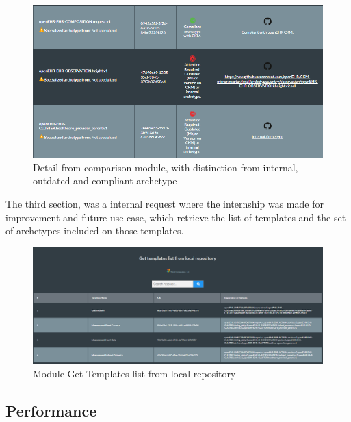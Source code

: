 \documentclass[mim_thesis.tex]{subfiles}
\begin{document}
\begin{figure}[H]
	\centering
    \includegraphics[width=1\textwidth]{img/arch_comparison_2.PNG}
	\caption{Detail from comparison module, with distinction from internal, outdated and compliant archetype}
	\label{fig:arch_comparison_2}
\end{figure}


The third section, was a internal request where the internship was made for improvement and future use case, which retrieve the list of templates and the set of archetypes included on those templates.

\begin{figure}[H]
	\centering
    \includegraphics[width=1\textwidth]{img/get_temp_list.PNG}
	\caption{Module Get Templates list from local repository }
	\label{fig:get_temp_list}
\end{figure}

\subsection{Performance}
\end{document}
